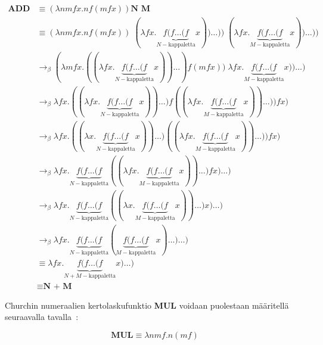 \begin{align*} \textbf{ADD N M} &\equiv (\lambda nmfx . n f (m f x)) \textbf{N M} \\ 
&\equiv  (\lambda nmfx . n f (m f x)) \; (\lambda fx . \underbrace{ f ( f \ldots (f }_{ N-\text{kappaletta}} x)) \ldots )) \; (\lambda fx . \underbrace{ f ( f \ldots (f }_{ M-\text{kappaletta}} x)) \ldots ))\\ 
&\rightarrow_{\beta} (\lambda mfx . ((\lambda fx . \underbrace{ f ( f \ldots (f }_{ N-\text{kappaletta}} x)) \ldots ) f (m f x)) \; \lambda fx . \underbrace{ f ( f \ldots (f }_{ M-\text{kappaletta}} x)) \ldots )\\ 
&\rightarrow_{\beta} \lambda fx . ((\lambda fx . \underbrace{ f ( f \ldots (f }_{ N-\text{kappaletta}} x)) \ldots ) f ( (\lambda fx . \underbrace{ f ( f \ldots (f }_{ M-\text{kappaletta}} x)) \ldots )) f x ) \\
&\rightarrow_{\beta} \lambda fx . ((\lambda x . \underbrace{ f ( f \ldots (f }_{ N-\text{kappaletta}} x)) \ldots ) ( (\lambda fx . \underbrace{ f ( f \ldots (f }_{ M-\text{kappaletta}} x)) \ldots )) f x ) \\
&\rightarrow_{\beta}  \lambda fx . \underbrace{ f ( f \ldots (f }_{ N-\text{kappaletta}} ( (\lambda fx . \underbrace{ f ( f \ldots (f }_{ M-\text{kappaletta}} x)) \ldots ) f x ) \ldots )\\
&\rightarrow_{\beta}  \lambda fx . \underbrace{ f ( f \ldots (f }_{ N-\text{kappaletta}} ( (\lambda x . \underbrace{ f ( f \ldots (f }_{ M-\text{kappaletta}} x)) \ldots )  x ) \ldots) \\
&\rightarrow_{\beta}  \lambda fx . \underbrace{ f ( f \ldots (f }_{ N-\text{kappaletta}} (\underbrace{ f ( f \ldots (f }_{ M-\text{kappaletta}} x) \ldots ) \ldots ) \\
&\equiv \lambda fx . \underbrace{ f ( f \ldots (f }_{ N + M-\text{kappaletta}} x) \ldots ) \\
&\equiv \textbf{N + M}  
\end{align*}

Churchin numeraalien kertolaskufunktio \textbf{MUL} voidaan puolestaan määritellä seuraavalla tavalla~\cite[s.~20]{Sel2013}:

\[ \textbf{MUL} \equiv \lambda n m f . n (mf) \]

